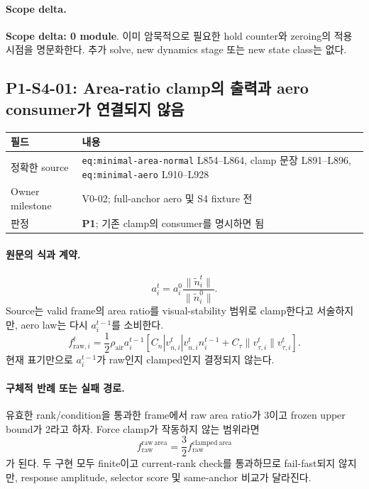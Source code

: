 \documentclass[11pt]{article}
\newcommand{\src}[1]{\textcolor{CoreBlue}{\nolinkurl{#1}}}
\newcommand{\pone}{\textcolor{WarnOrange}{\textbf{P1}}}
\newcommand{\scopezero}{\textcolor{SafeGreen}{\textbf{Scope delta: 0 module}}}
\begin{document}
\paragraph{Scope delta.}
\scopezero. 이미 암묵적으로 필요한 hold counter와 zeroing의 적용 시점을 명문화한다.
추가 solve, new dynamics stage 또는 new state class는 없다.

\subsection{P1-S4-01: Area-ratio clamp의 출력과 aero consumer가 연결되지 않음}

\begin{tabularx}{\textwidth}{L{0.22\textwidth}Y}
\toprule
필드 & 내용 \\
\midrule
정확한 source & \src{eq:minimal-area-normal} L854--L864, clamp 문장 L891--L896, \src{eq:minimal-aero} L910--L928 \\
Owner milestone & V0-02; full-anchor aero 및 S4 fixture 전 \\
판정 & \pone; 기존 clamp의 consumer를 명시하면 됨 \\
\bottomrule
\end{tabularx}

\paragraph{원문의 식과 계약.}
\begin{equation}
  a_i^t
  =
  a_i^0
  \frac{\|\widetilde n_i^t\|}{\|\widetilde n_i^0\|}.
  \tag{source: eq:minimal-area-normal}
\end{equation}
Source는 valid frame의 area ratio를 visual-stability 범위로 clamp한다고 서술하지만,
aero law는 다시 $a_i^{t-1}$를 소비한다.
\begin{equation}
  f_{\mathrm{raw},i}^t
  =
  \frac12\rho_{\mathrm{air}}a_i^{t-1}
  \left[
  C_n|v_{n,i}^t|v_{n,i}^tn_i^{t-1}
  +C_\tau\|v_{\tau,i}^t\|v_{\tau,i}^t
  \right].
\end{equation}
현재 표기만으로 $a_i^{t-1}$가 raw인지 clamped인지 결정되지 않는다.

\paragraph{구체적 반례 또는 실패 경로.}
유효한 rank/condition을 통과한 frame에서 raw area ratio가 3이고 frozen upper bound가 2라고 하자.
Force clamp가 작동하지 않는 범위라면
\begin{equation}
  f_{\mathrm{raw}}^{\mathrm{raw\ area}}
  =
  \frac{3}{2}
  f_{\mathrm{raw}}^{\mathrm{clamped\ area}}
\end{equation}
가 된다. 두 구현 모두 finite이고 current-rank check를 통과하므로 fail-fast되지 않지만,
response amplitude, selector score 및 same-anchor 비교가 달라진다.
\end{document}
